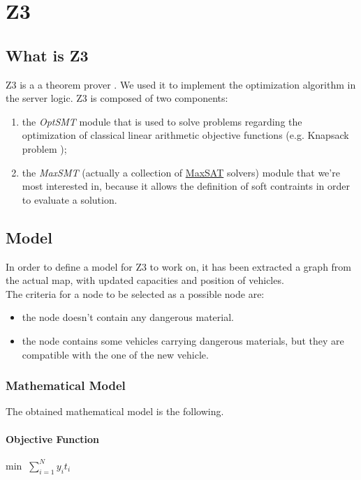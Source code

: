 \section{Z3}\label{Z3}
\subsection{What is Z3}
Z3 is a a theorem prover \cite{z3}. We used it to implement the optimization algorithm in the server logic. Z3 is composed of two components:
\begin{enumerate}
  \item the \textit{OptSMT} module that is used to solve problems regarding the optimization of classical linear arithmetic objective functions (e.g. Knapsack problem \cite{knapsack});
  \item the \textit{MaxSMT} (actually a collection of \underline{MaxSAT} solvers) module that we're most interested in, because it allows the definition of soft contraints in order to evaluate a solution.
\end{enumerate}


\subsection{Model}
In order to define a model for Z3 to work on, it has been extracted a graph from the actual map, with updated capacities and position of vehicles.\\
The criteria for a node to be selected as a possible node are:
\begin{itemize}
	\item the node doesn't contain any dangerous material.
	\item the node contains some vehicles carrying dangerous materials, but they are compatible with the one of the new vehicle.\\
\end{itemize}

\subsubsection{Mathematical Model}\label{Subs:MathModel}
The obtained mathematical model is the following.

\paragraph{Objective Function}
\begin{description}
	\item min $\ \sum_{i=1}^{N} y_{i}t_{i}$
\end{description}

